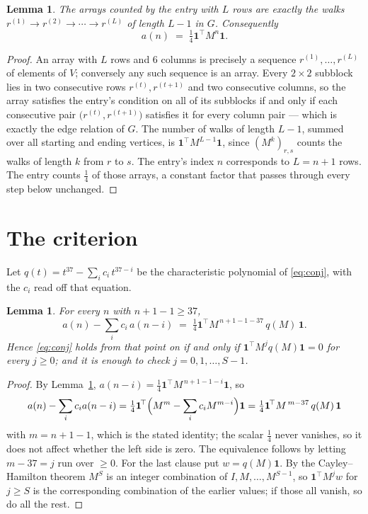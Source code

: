 \documentclass[11pt,a4paper]{article}
\theoremstyle{plain}
\newtheorem{lemma}[theorem]{Lemma}
\theoremstyle{definition}
\begin{document}
\begin{lemma}\label{lem:walk}
The arrays counted by the entry with $L$ rows are exactly the walks
$r^{(1)}\to r^{(2)}\to\cdots\to r^{(L)}$ of length $L-1$ in $G$. Consequently
\[
a(n)\;=\;\tfrac1{4}\mathbf{1}^{\!\top}M^{n}\mathbf{1} .
\]
\end{lemma}

\begin{proof}
An array with $L$ rows and $6$ columns is precisely a sequence
$r^{(1)},\dots,r^{(L)}$ of elements of $V$; conversely any such sequence is an array.
Every $2\times2$ subblock lies in two consecutive rows $r^{(t)},r^{(t+1)}$ and two
consecutive columns, so the array satisfies the entry's condition on all of its subblocks
if and only if each consecutive pair $\bigl(r^{(t)},r^{(t+1)}\bigr)$ satisfies it for
every column pair --- which is exactly the edge relation of $G$. The number of walks of
length $L-1$, summed over all starting and ending vertices, is
$\mathbf{1}^{\!\top}M^{L-1}\mathbf{1}$, since $(M^{k})_{r,s}$ counts the walks of
length $k$ from $r$ to $s$. The entry's index $n$ corresponds to $L=n+1$ rows. The entry counts $\tfrac1{4}$ of those arrays, a constant factor that passes through every step below unchanged.
\end{proof}

\section{The criterion}

Let $q(t)=t^{37}-\sum_i c_i\,t^{37-i}$ be the characteristic polynomial of
\eqref{eq:conj}, with the $c_i$ read off that equation.

\begin{lemma}\label{lem:crit}
For every $n$ with $n+1-1\ge37$,
\[
a(n)-\sum_i c_i\,a(n-i)\;=\;\tfrac1{4}\mathbf{1}^{\!\top}M^{\,n+1-1-37}\,q(M)\,\mathbf{1} .
\]
Hence \eqref{eq:conj} holds from that point on if and only if
$\mathbf{1}^{\!\top}M^{j}q(M)\mathbf{1}=0$ for every $j\ge0$; and it is enough to check
$j=0,1,\dots,S-1$.
\end{lemma}

\begin{proof}
By Lemma~\ref{lem:walk}, $a(n-i)=\tfrac1{4}\mathbf{1}^{\!\top}M^{\,n+1-1-i}\mathbf{1}$, so
\[
a(n)-\sum_i c_i a(n-i)
=\tfrac1{4}\mathbf{1}^{\!\top}\Bigl(M^{m}-\sum_i c_i M^{m-i}\Bigr)\mathbf{1}
=\tfrac1{4}\mathbf{1}^{\!\top}M^{\,m-37}\,q(M)\,\mathbf{1}
\]
with $m=n+1-1$, which is the stated identity; the scalar $\tfrac1{4}$ never vanishes, so
it does not affect whether the left side is zero. The equivalence follows by letting
$m-37=j$ run over $\ge0$. For the last clause put $w=q(M)\mathbf{1}$. By the
Cayley--Hamilton theorem $M^{S}$ is an integer combination of $I,M,\dots,M^{S-1}$, so
$\mathbf{1}^{\!\top}M^{j}w$ for $j\ge S$ is the corresponding combination of the earlier
values; if those all vanish, so do all the rest.
\end{proof}
\end{document}
